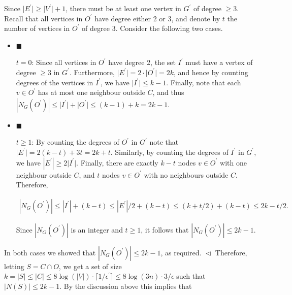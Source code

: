\documentclass[10pt,a4paper]{article}
\begin{document}
Since $\lvert E^{\prime}\rvert\geq\lvert V^{\prime}\rvert+1$, there must be at least one vertex in $G^{\prime}$ of degree $\geq 3$.
Recall that all vertices in $O^{\prime}$ have degree either 2 or 3, and denote by $t$ the number of vertices in $O^{\prime}$ of degree 3.
Consider the following two cases.\par


\begin{itemize}


\item[] 
$\blacksquare$ 


$t=0$:
Since all vertices in $O^{\prime}$ have degree 2, the set $I^{\prime}$ must have a vertex of degree $\geq 3$ in $G^{\prime}$. Furthermore, $\lvert E^{\prime}\rvert=2\cdot\lvert O^{\prime}\rvert=2k$, and hence by counting degrees of the vertices in $I^{\prime}$, we have $\lvert I^{\prime}\rvert\leq k-1$.
Finally, note that each $v\in O^{\prime}$ has at most one neighbour outside $C$, and thus $|N_{G}(O^{\prime})|\leq\lvert I^{\prime}\rvert+\lvert O^{\prime}\rvert\leq(k-1)+k=2k-1$.\par





\item[] 
$\blacksquare$ 


$t\geq 1$:
By counting the degrees of $O^{\prime}$ in $G^{\prime}$ note that $\lvert E^{\prime}\rvert=2(k-t)+3t=2k+t$.
Similarly, by counting the degrees of $I^{\prime}$ in $G^{\prime}$, we have $|E^{\prime}|\geq 2\lvert I^{\prime}\rvert$.
Finally, there are exactly $k-t$ nodes $v\in O^{\prime}$ with one neighbour outside $C$, and $t$ nodes $v\in O^{\prime}$ with no neighbours outside $C$.
Therefore,\par


\[\begin{gathered}
|N_{G}(O^{\prime})|\leq|I^{\prime}|+(k-t)\leq|E^{\prime}|/2+(k-t)\leq(k+t/2)+(k-t)\leq 2k-t/2.
\end{gathered}\]


Since $|N_{G}(O^{\prime})|$ is an integer and $t\geq 1$, it follows that
$|N_{G}(O^{\prime})|\leq 2k-1$.\par





\end{itemize}


In both cases we showed that $|N_{G}(O^{\prime})|\leq 2k-1$, as required.
$\vartriangleleft$
Therefore, letting $S=C\cap O$, we get a set of size $k=\lvert S\rvert\leq\lvert C\rvert\leq 8\log(\lvert V\rvert)\cdot\lceil 1/\epsilon^{\prime}\rceil\leq 8\log(3n)\cdot 3/\epsilon$ such that $\lvert N(S)\rvert\leq 2k-1$. By the discussion above this implies that\par
\end{document}
